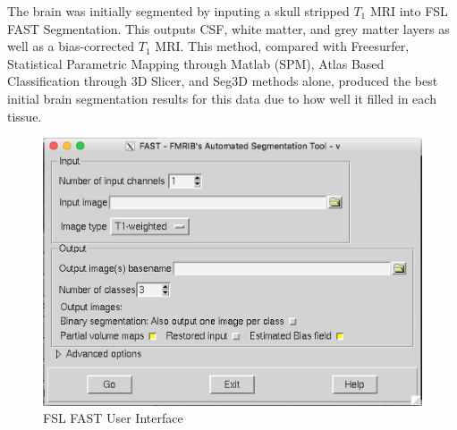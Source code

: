 The brain was initially segmented by inputing a skull stripped $T_1$ MRI into FSL FAST Segmentation. This outputs CSF, white matter, and grey matter layers as well as a bias-corrected $T_1$ MRI. This method, compared with Freesurfer, Statistical Parametric Mapping through Matlab (SPM), Atlas Based Classification through 3D Slicer, and Seg3D methods alone, produced the best initial brain segmentation results for this data due to how well it filled in each tissue. 
\begin{figure}[H]
    \centering
    \includegraphics[width=.8\textwidth]{Figures/FSL_FAST}
    \caption{FSL FAST User Interface }
    \label{fig:fslfast}
\end{figure}

